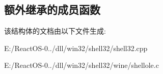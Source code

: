 \subsection*{额外继承的成员函数}


该结构体的文档由以下文件生成\+:\begin{DoxyCompactItemize}
\item 
E\+:/\+React\+O\+S-\/0../dll/win32/shell32/shell32.\+cpp\item 
E\+:/\+React\+O\+S-\/0../dll/win32/shell32/wine/shellole.\+c\end{DoxyCompactItemize}
